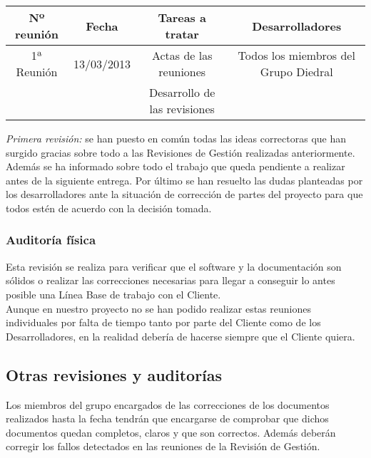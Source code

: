 \documentclass[11pt, a4paper, twoside, titlepage]{article}
\begin{document}
		\begin{center}
				\begin{tabular}{| c | c | c | c |}
				\hline
				\bfseries Nº reunión	& \bfseries Fecha 	& \bfseries Tareas a tratar 	& \bfseries Desarrolladores	\\ \hline
				1ª Reunión	& 13/03/2013 	& Actas de las reuniones & Todos los miembros del Grupo Diedral	\\ 							&		& Desarrollo de las revisiones &				\\ \hline
				\end{tabular}
			\end{center}
			
			\textit{Primera revisión:} se han puesto en común todas las ideas correctoras que han surgido gracias sobre todo a las Revisiones de Gestión realizadas anteriormente. Además se ha informado sobre todo el trabajo que queda pendiente a realizar antes de la siguiente entrega. Por último se han resuelto las dudas planteadas por los desarrolladores ante la situación de corrección de partes del proyecto para que todos estén de acuerdo con la decisión tomada. %

		\subsubsection{Auditoría física}
			Esta revisión se realiza para verificar que el software y la documentación son sólidos o realizar las correcciones necesarias para llegar a conseguir lo antes posible una Línea Base de trabajo con el Cliente.\\
		Aunque en nuestro proyecto no se han podido realizar estas reuniones individuales por falta de tiempo tanto por parte del Cliente como de los Desarrolladores, en la realidad debería de hacerse siempre que el Cliente quiera.
		
		\subsection{Otras revisiones y auditorías}
			Los miembros del grupo encargados de las correcciones de los documentos realizados hasta la fecha tendrán que encargarse 	de comprobar que dichos documentos quedan completos, claros y que son correctos. Además deberán corregir los fallos detectados en las reuniones de la Revisión de Gestión. \\
		
\end{document}
